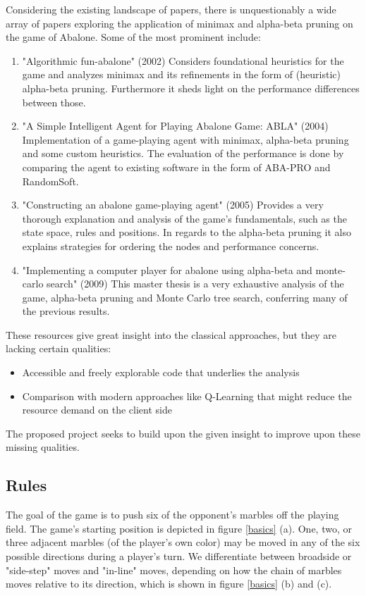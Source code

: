 \documentclass{../llncs}
\begin{document}
Considering the existing landscape of papers, there is unquestionably a wide array of papers exploring the application of minimax and alpha-beta pruning on the game of Abalone. Some of the most prominent include:

\begin{enumerate}
	\item "Algorithmic fun-abalone" (2002) Considers foundational heuristics for the game and analyzes minimax and its refinements in the form of (heuristic) alpha-beta pruning. Furthermore it sheds light on the performance differences between those. \cite{aichholzer_algorithmic_2002}
	\item "A Simple Intelligent Agent for Playing Abalone Game: ABLA" (2004) Implementation of a game-playing agent with minimax, alpha-beta pruning and some custom heuristics. The evaluation of the performance is done by comparing the agent to existing software in the form of ABA-PRO and RandomSoft.\cite{ozcan_simple_2004}
	\item "Constructing an abalone game-playing agent" (2005) Provides a very thorough explanation and analysis of the game's fundamentals, such as the state space, rules and positions. In regards to the alpha-beta pruning it also explains strategies for ordering the nodes and performance concerns. \cite{lemmens_constructing_2005}
	\item "Implementing a computer player for abalone using alpha-beta and monte-carlo search" (2009) This master thesis is a very exhaustive analysis of the game, alpha-beta pruning and Monte Carlo tree search, conferring many of the previous results. \cite{chorus_implementing_2009}
\end{enumerate}

These resources give great insight into the classical approaches, but they are lacking certain qualities:
\begin{itemize}
	\item Accessible and freely explorable code that underlies the analysis
	\item Comparison with modern approaches like Q-Learning that might reduce the resource demand on the client side
\end{itemize}

The proposed project seeks to build upon the given insight to improve upon these missing qualities.

\subsection{Rules}
The goal of the game is to push six of the opponent's marbles off the playing field. The game's starting position is depicted in figure \ref{basics} (a). One, two, or three adjacent marbles (of the player's own color) may be moved in any of the six possible directions during a player's turn. We differentiate between broadside or "side-step" moves and "in-line" moves, depending on how the chain of marbles moves relative to its direction, which is shown in figure \ref{basics} (b) and (c).
\end{document}
